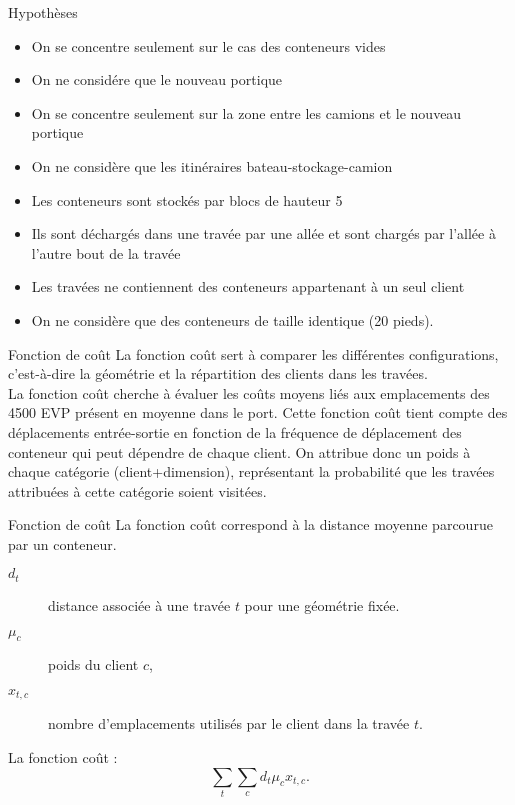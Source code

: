 \begin{frame}{Hypothèses}
  \begin{itemize}
  \item On se concentre seulement sur le cas des conteneurs vides
    \vfill
  \item On ne considére que le nouveau portique
    \vfill
  \item On se concentre seulement sur la zone entre les camions et le nouveau portique
    \vfill
  \item On ne considère que les itinéraires bateau-stockage-camion
    \vfill
  \item Les conteneurs sont stockés par blocs de hauteur 5
    \vfill
  \item Ils sont déchargés dans une travée par une allée et sont chargés par l'allée à l'autre bout de la travée
    \vfill
  \item Les travées ne contiennent des conteneurs appartenant à un seul client
    \vfill
  \item On ne considère que des conteneurs de taille identique (20 pieds).
  \end{itemize}
  \vfill
\end{frame}

\begin{frame}{Fonction de coût}
  \vfill
  La fonction coût sert à comparer les différentes configurations, c'est-à-dire la géométrie et la répartition des clients dans les travées.\\
  \vfill
  La fonction coût cherche à évaluer les coûts moyens liés aux emplacements des 4500 EVP présent en moyenne dans le port.
  Cette fonction coût tient compte des déplacements entrée-sortie en fonction de la fréquence de déplacement des conteneur qui peut dépendre de chaque client.
  \vfill
  On attribue donc un poids à chaque catégorie (client+dimension), représentant la probabilité que les travées attribuées à cette catégorie soient visitées.
\end{frame}

\begin{frame}{Fonction de coût}
  La fonction coût correspond à la distance moyenne parcourue par un conteneur.
  \begin{description}
  \item[$d_t$] distance associée à une travée $t$ pour une géométrie fixée.
  \item[$\mu_c$] poids du client $c$,
  \item[$x_{t,c}$] nombre d'emplacements utilisés par le client dans la travée $t$.
  \end{description}
  \vfill
  La fonction coût  : 
  $$ \sum_t \sum_c d_t\mu_c x_{t,c}.  $$
  \vfill
\end{frame}

